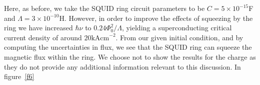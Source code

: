 \documentclass[12pt,a4paper,superscriptaddress,showpacs,floatfix,pra]{revtex4-2}
\begin{document}
Here,  as before,  we take  the SQUID  ring circuit  parameters  to be
$C=5\times      10^{-15}$\textrm{F}     and      $\Lambda     =3\times
10^{-10}$\textrm{H}.  However,  in order  to  improve  the effects  of
squeezing  by the ring  we have  increased $\hbar  \nu $  to $0.24\Phi
_{0}^{2}/\Lambda  $,  yielding   a  superconducting  critical  current
density  of  around  $20\mathrm{kAcm}^{-2}$.  From our  given  initial
condition, and by computing the uncertainties in flux, we see that the
SQUID ring  can squeeze the magnetic  flux within the  ring. We choose
not to  show the  results for the  charge as  they do not  provide any
additional   information    {relevant   to   this    discussion}.   In
figure~\ref{f6}
\begin{figure}[!t]
\begin{center}

\end{center}
\end{figure}
\end{document}
